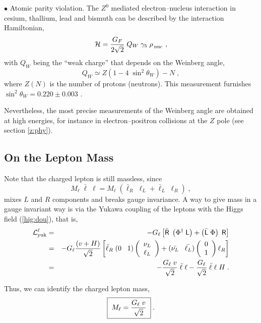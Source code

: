 \documentclass[12pt]{report}
\def\text#1{{\scriptstyle\mathrm{#1}}}
\newcommand{\gc}{\gamma_5}
\newcommand{\ld}{\mbox{\sf L}}
\newcommand{\rs}{\mbox{\sf R}}
\newcommand{\lag}{{\cal L}}
\newcommand{\ba}{\begin{array}}
\newcommand{\ea}{\end{array}}
\begin{document}
$\bullet$ {Atomic parity violation}. The $Z^0$ mediated
electron--nucleus interaction in cesium, thallium, lead and 
bismuth can be described by the interaction Hamiltonian,
\[
{\cal H} = \frac{G_F}{2\sqrt{2}} \; Q_W \; \gc \;
\rho_{\, _{\text{nuc}}} \; ,
\]
with $Q_W$ being the ``weak charge'' that depends on the Weinberg
angle,  
\[
Q_W \simeq Z (1 - 4 \; { \sin^2\theta_W}) - N \; ,
\]
where $Z(N)$ is the number of protons (neutrons). This measurement
furnishes  $\sin^2\theta_W = 0.220 \pm 0.003$ \cite{pdg:98}. 

Nevertheless, the most precise measurements of the Weinberg angle are 
obtained at high energies, for instance in electron--positron
collisions at the $Z$ pole (see section \ref{z:phy}).  


\subsection{On the Lepton Mass} \indent

Note that the charged lepton is still massless, since
\[
M_\ell \; \bar{\ell} \; \ell = M_\ell \; (\bar{\ell}_R \; \ell_L + 
\bar{\ell}_L \; \ell_R)  \; ,
\]
mixes $L$ and $R$ components and breaks gauge invariance.  A way to
give mass in a gauge invariant way is via the Yukawa coupling of the
leptons with the Higgs field (\ref{hig:dou}), that is,
\begin{eqnarray}
\lag_{\text{yuk}}^\ell &=& - G_\ell 
\left[ \bar{\rs} \; \left( \Phi^\dagger \; \ld \right) +
 \left( \bar{\ld} \; \Phi \right) \; \rs \right] 
\nonumber \\
&=&  - G_\ell \frac{(v + H)}{\sqrt{2}} 
\left[ \bar{\ell}_R \; (0  \;\;\; 1) \left( \ba{c}
	      				\nu_L\\
	      				\ell_L
              				\ea \right) +
(\bar{\nu_L} \;\;\; \bar{\ell_L}) \left( \ba{c}
	      				0\\
	      				1
              				\ea \right) \ell_R \right]
\nonumber \\
&=& - \frac{G_\ell \; v}{\sqrt{2}} \; \bar{\ell} \; \ell  - 
      \frac{G_\ell}{\sqrt{2}} \; \bar{\ell} \; \ell \; H \; .
\label{yuk:lep}
\end{eqnarray}

Thus, we can identify the charged lepton mass,
\begin{equation}
\fbox{$ \; \displaystyle{M_\ell = \frac{G_\ell \; v}{\sqrt{2}}} \; $}
\; .
\label{ml}
\end{equation}
\end{document}
